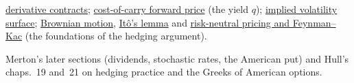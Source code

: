 \begin{qfmodel}
 \hyperref[def:derivative-contracts]{derivative contracts}; \hyperref[res:cost-of-carry-forward-price]{cost-of-carry forward price} (the yield $q$); \hyperref[def:implied-volatility-surface]{implied volatility surface}; \hyperref[def:brownian-motion-quadratic-variation]{Brownian motion}, \hyperref[res:ito-lemma-geometric-brownian-motion]{It\^o's lemma} and \hyperref[res:risk-neutral-pricing-feynman-kac]{risk-neutral pricing and Feynman--Kac} (the foundations of the hedging argument).

 Merton's later sections (dividends, stochastic rates, the American put) and Hull's chaps.~19 and~21 on hedging practice and the Greeks of American options.

\end{qfmodel}


